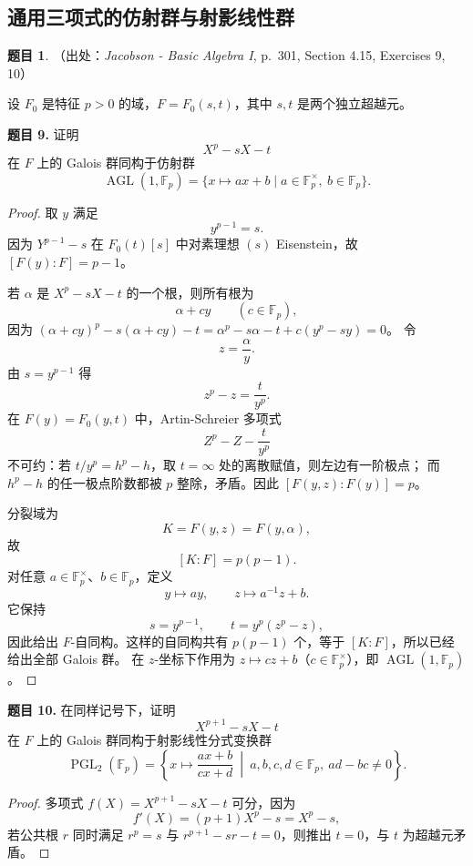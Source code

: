 \documentclass[a4paper]{ctexart}
\theoremstyle{definition}
\newtheorem{example}{题目}[section]
\theoremstyle{analysis}
\theoremstyle{plain}
\begin{document}
\subsection{\texorpdfstring{通用三项式的仿射群与射影线性群}{通用三项式的仿射群与射影线性群}}\label{subsec:problem-uchida-generic-trinomials}

\begin{example}
（出处：\textit{Jacobson - Basic Algebra I}, p.~301, Section 4.15, Exercises 9, 10）

设 \(F_0\) 是特征 \(p>0\) 的域，\(F=F_0(s,t)\)，其中 \(s,t\) 是两个独立超越元。

\textbf{题目 9.} 证明
\[
  X^p-sX-t
\]
在 \(F\) 上的 Galois 群同构于仿射群
\[
  \operatorname{AGL}(1,\mathbb F_p)
  =\{x\mapsto ax+b\mid a\in\mathbb F_p^\times,\ b\in\mathbb F_p\}.
\]

\begin{proof}
取 \(y\) 满足
\[
  y^{p-1}=s.
\]
因为 \(Y^{p-1}-s\) 在 \(F_0(t)[s]\) 中对素理想 \((s)\) Eisenstein，故
\([F(y):F]=p-1\)。

若 \(\alpha\) 是 \(X^p-sX-t\) 的一个根，则所有根为
\[
  \alpha+cy\qquad(c\in\mathbb F_p),
\]
因为 \((\alpha+cy)^p-s(\alpha+cy)-t=\alpha^p-s\alpha-t+c(y^p-sy)=0\)。
令
\[
  z=\frac{\alpha}{y}.
\]
由 \(s=y^{p-1}\) 得
\[
  z^p-z=\frac{t}{y^p}.
\]
在 \(F(y)=F_0(y,t)\) 中，Artin-Schreier 多项式
\[
  Z^p-Z-\frac{t}{y^p}
\]
不可约：若 \(t/y^p=h^p-h\)，取 \(t=\infty\) 处的离散赋值，则左边有一阶极点；
而 \(h^p-h\) 的任一极点阶数都被 \(p\) 整除，矛盾。因此
\([F(y,z):F(y)]=p\)。

分裂域为
\[
  K=F(y,z)=F(y,\alpha),
\]
故
\[
  [K:F]=p(p-1).
\]
对任意 \(a\in\mathbb F_p^\times\)、\(b\in\mathbb F_p\)，定义
\[
  y\longmapsto ay,\qquad z\longmapsto a^{-1}z+b.
\]
它保持
\[
  s=y^{p-1},\qquad t=y^p(z^p-z),
\]
因此给出 \(F\)-自同构。这样的自同构共有 \(p(p-1)\) 个，等于 \([K:F]\)，所以已经给出全部 Galois 群。
在 \(z\)-坐标下作用为 \(z\mapsto cz+b\)（\(c\in\mathbb F_p^\times\)），即
\(\operatorname{AGL}(1,\mathbb F_p)\)。
\end{proof}

\textbf{题目 10.} 在同样记号下，证明
\[
  X^{p+1}-sX-t
\]
在 \(F\) 上的 Galois 群同构于射影线性分式变换群
\[
  \operatorname{PGL}_2(\mathbb F_p)
  =
  \left\{
  x\mapsto \frac{ax+b}{cx+d}\ \middle|\
  a,b,c,d\in\mathbb F_p,\ ad-bc\ne0
  \right\}.
\]

\begin{proof}
多项式 \(f(X)=X^{p+1}-sX-t\) 可分，因为
\[
  f'(X)=(p+1)X^p-s=X^p-s,
\]
若公共根 \(r\) 同时满足 \(r^p=s\) 与 \(r^{p+1}-sr-t=0\)，则推出 \(t=0\)，与 \(t\) 为超越元矛盾。


\end{proof}
\end{example}
\end{document}
